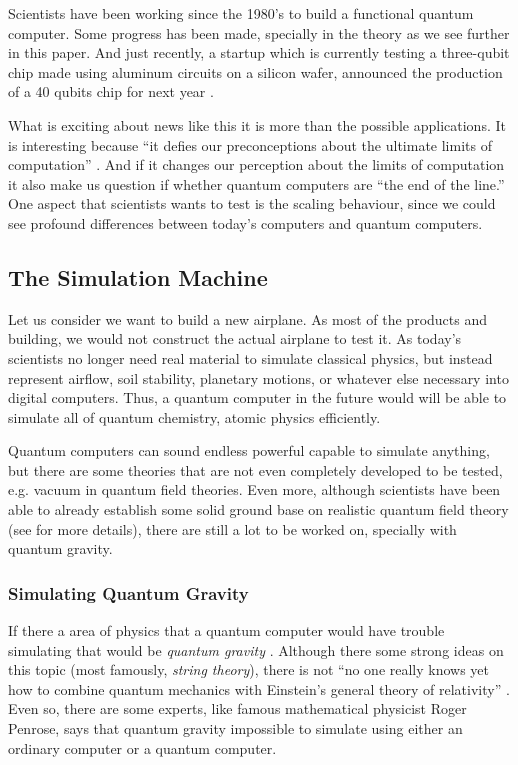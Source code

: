 \documentclass[twoside,11pt]{article}
\begin{document}
Scientists have been working since the 1980's to build a functional quantum computer.
Some progress has been made, specially in the theory as we see further in this paper.
And just recently, a startup which is currently testing a three-qubit chip made using aluminum circuits on a silicon wafer, announced the production of a 40 qubits chip for next year \citep{mitsu16}.

What is exciting about news like this it is more than the possible applications.
It is interesting because ``it defies our preconceptions about the ultimate limits of computation'' \citep{scott16}.
And if it changes our perception about the limits of computation it also make us question if whether quantum computers are ``the end of the line.''
One aspect that scientists wants to test is the scaling behaviour, since we could see profound differences between today’s computers and quantum computers.


\subsection{The Simulation Machine}

Let us consider we want to build a new airplane.
As most of the products and building, we would not construct the actual airplane to test it.
As today’s scientists no longer need real material to simulate classical physics, but instead represent airflow, soil stability, planetary motions, or whatever else necessary into digital computers.
Thus, a quantum computer in the future would will be able to simulate all of quantum chemistry, atomic physics efficiently.

Quantum computers can sound endless powerful capable to simulate anything, but there are some theories that are not even completely developed to be tested, e.g. vacuum in quantum field theories.
Even more, although scientists have been able to already establish some solid ground base on realistic quantum field theory (see \citep{jordan2012quantum} for more details), there are still a lot to be worked on, specially with quantum gravity.

\subsubsection{Simulating Quantum Gravity}

If there a area of physics that  a quantum computer would have trouble simulating that would be \emph{quantum gravity} \citep{hamber2009quantum}. 
Although there some strong ideas on this topic (most famously, \emph{string theory}), there is not ``no one really knows yet how to combine quantum mechanics with Einstein’s general theory of relativity'' \citep{scott16}.
Even so, there are some experts, like famous mathematical physicist Roger Penrose, says that quantum gravity impossible to simulate using either an ordinary computer or a quantum computer.
\end{document}

